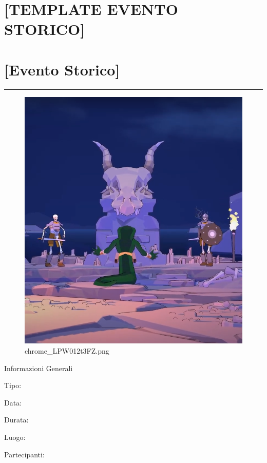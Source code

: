 \section{{[}TEMPLATE EVENTO STORICO{]}}\label{template-evento-storico}

\section{{[}Evento Storico{]}}\label{evento-storico}

\begin{center}\rule{0.5\linewidth}{0.5pt}\end{center}

\begin{figure}
\centering
\includegraphics{chrome_LPW012t3FZ.png}
\caption{chrome\_LPW012t3FZ.png}
\end{figure}

Informazioni Generali

Tipo:

Data:

Durata:

Luogo:

Partecipanti:

